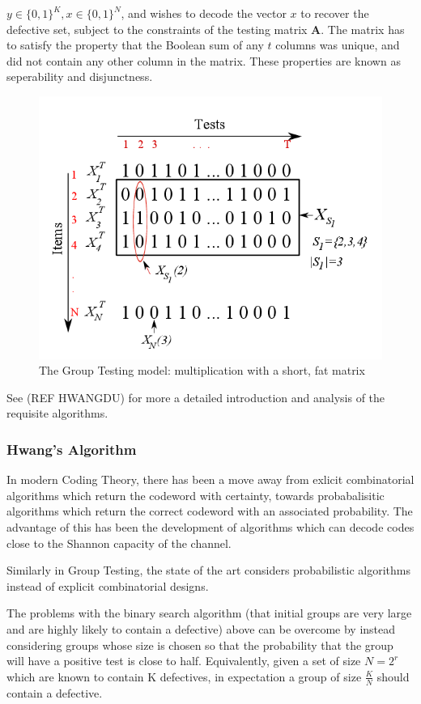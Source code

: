 \documentclass[12pt, a4paper]{article}
\begin{document}
\(y \in \{0,1\}^K, x \in \{0,1\}^N\), and wishes to decode the vector \(x\) to recover the defective set, subject to the constraints of the testing matrix \(\textbf{A}\). The matrix has to satisfy the property that the Boolean sum of any \(t\) columns was unique, and did not contain any other column in the matrix. These properties are known as seperability and disjunctness. 

\begin{figure}[h]
\centering
\includegraphics[height = 7 cm]{GTFat.png}
\caption{The Group Testing model: multiplication with a short, fat matrix \cite{Atia2008}}
\label{bayesiancs}
\end{figure}

See (REF HWANGDU) for more a detailed introduction and analysis of the requisite algorithms.

\subsubsection*{Hwang's Algorithm}
In modern Coding Theory, there has been a move away from exlicit combinatorial algorithms which return the codeword with certainty, towards probabalisitic algorithms which return the correct codeword with an associated probability. The advantage of this has been the development of algorithms which can decode codes close to the Shannon capacity of the channel.

Similarly in Group Testing, the state of the art considers probabilistic algorithms instead of explicit combinatorial designs. 

The problems with the binary search algorithm (that initial groups are very large and are highly likely to contain a defective) above can be overcome by instead considering groups whose size is chosen so that the probability that the group will have a positive test is close to half. Equivalently, given a set of size \(N=2^r\) which are known to contain K defectives, in expectation a group of size \(\frac{K}{N}\) should contain a defective. 
\end{document}
